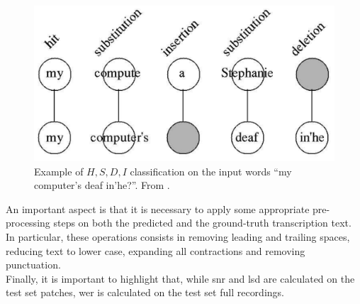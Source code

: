 \begin{figure}[!htb]
	\begin{center}
		\includegraphics[scale=0.4]{img/wer_letters.png}
		\caption{Example of $H, S, D, I$ classification on the input words “my computer’s deaf in’he?”. From \cite{morris2004and}.}
		\label{fig:wer_letters}
	\end{center}
\end{figure}

\noindent An important aspect is that it is necessary to apply some appropriate pre-processing steps on both the predicted and the ground-truth transcription text. In particular, these operations consists in removing leading and trailing spaces, reducing text to lower case, expanding all contractions and removing punctuation. \\
Finally, it is important to highlight that, while \gls{snr} and \gls{lsd} are calculated on the test set patches, \gls{wer} is calculated on the test set full recordings. 

